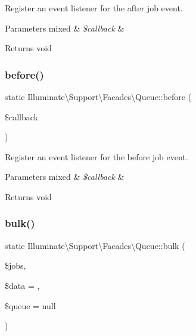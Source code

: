 Register an event listener for the after job event.


\begin{DoxyParams}[1]{Parameters}
mixed & {\em \$callback} & \\
\hline
\end{DoxyParams}
\begin{DoxyReturn}{Returns}
void 
\end{DoxyReturn}
\mbox{\label{class_illuminate_1_1_support_1_1_facades_1_1_queue_a98b4d092f13b6ad01c075f2790c15b40}} 
\subsubsection{\texorpdfstring{before()}{before()}}
{\footnotesize\ttfamily static Illuminate\textbackslash{}\+Support\textbackslash{}\+Facades\textbackslash{}\+Queue\+::before (\begin{DoxyParamCaption}\item[{}]{\$callback }\end{DoxyParamCaption})\hspace{0.3cm}{\ttfamily [static]}}

Register an event listener for the before job event.


\begin{DoxyParams}[1]{Parameters}
mixed & {\em \$callback} & \\
\hline
\end{DoxyParams}
\begin{DoxyReturn}{Returns}
void 
\end{DoxyReturn}
\mbox{\label{class_illuminate_1_1_support_1_1_facades_1_1_queue_a49cac55a7c41728b0c1a7e42397384c9}} 
\subsubsection{\texorpdfstring{bulk()}{bulk()}}
{\footnotesize\ttfamily static Illuminate\textbackslash{}\+Support\textbackslash{}\+Facades\textbackslash{}\+Queue\+::bulk (\begin{DoxyParamCaption}\item[{}]{\$jobs,  }\item[{}]{\$data = {\ttfamily \textquotesingle{}\textquotesingle{}},  }\item[{}]{\$queue = {\ttfamily null} }\end{DoxyParamCaption})\hspace{0.3cm}{\ttfamily [static]}}

